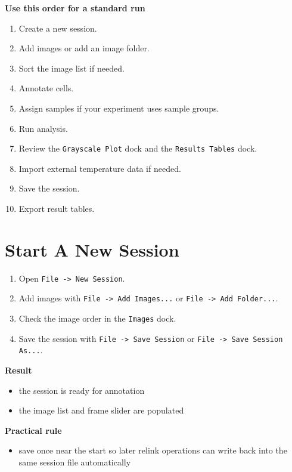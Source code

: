\documentclass[
  9pt,
  letterpaper,
  oneside,
  open=any,
  DIV=15,
  parskip=half-,
  headings=big,
  numbers=noenddot
]{scrbook}
\newcommand{\manuallead}[1]{%
  \vspace{0.15em}%
  {\sffamily\bfseries\color{ManualBlue}#1}\par\nobreak\vspace{0.05em}%
}
\begin{document}
\manuallead{Use this order for a standard run}

\begin{enumerate}[leftmargin=*,itemsep=0.35em,topsep=0.4em]
\item Create a new session.
\item Add images or add an image folder.
\item Sort the image list if needed.
\item Annotate cells.
\item Assign samples if your experiment uses sample groups.
\item Run analysis.
\item Review the \texttt{Grayscale Plot} dock and the \texttt{Results Tables} dock.
\item Import external temperature data if needed.
\item Save the session.
\item Export result tables.
\end{enumerate}

\section{Start A New Session}

\begin{enumerate}[leftmargin=*,itemsep=0.35em,topsep=0.4em]
\item Open \texttt{File -> New Session}.
\item Add images with \texttt{File -> Add Images...} or \texttt{File -> Add Folder...}.
\item Check the image order in the \texttt{Images} dock.
\item Save the session with \texttt{File -> Save Session} or \texttt{File -> Save Session As...}.
\end{enumerate}

\manuallead{Result}

\begin{itemize}[leftmargin=*,itemsep=0.35em,topsep=0.4em]
\item the session is ready for annotation
\item the image list and frame slider are populated
\end{itemize}

\manuallead{Practical rule}

\begin{itemize}[leftmargin=*,itemsep=0.35em,topsep=0.4em]
\item save once near the start so later relink operations can write back into the same session file automatically
\end{itemize}
\end{document}
